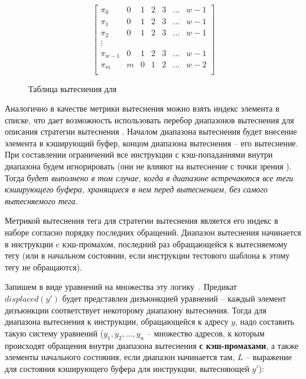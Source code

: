 \begin{figure}
$$
  \left[
    \begin{array}{c|cccccc}
      \pi_0 & 0 & 1 & 2 & 3 & \dots & w-1 \\
      \pi_1 & 0 & 1 & 2 & 3 & \dots & w-1 \\
      \pi_2 & 0 & 1 & 2 & 3 & \dots & w-1 \\
      \vdots &  &  &  & & & \\
      \pi_{w-1} & 0 & 1 & 2 & 3 & \dots & w-1 \\
      \pi_m & m & 0 & 1 & 2 & \dots & w-2 \\
    \end{array}
  \right]
$$
\caption{Таблица вытеснения для \FIFO}\label{fifo_policy_table}
\end{figure}

Аналогично \LRU в качестве метрики вытеснения можно взять индекс
элемента в списке, что дает возможность использовать перебор
диапазонов вытеснения для описания стратегии вытеснения \FIFO.
Началом диапазона вытеснения будет внесение элемента в кэширующий
буфер, концом диапазона вытеснения -- его вытеснение. При
составлении ограничений все инструкции с кэш-попаданиями внутри
диапазона будем игнорировать (они не влияют на вытеснение с точки
зрения \FIFO). Тогда \emph{\FIFO будет выполнено в том случае, когда
в диапазоне встречаются все теги кэширующего буфера, хранящиеся в
нем перед вытеснением, без самого вытесняемого тега}.

\begin{utv}
Метрикой вытеснения тега для стратегии вытеснения \FIFO является его
индекс в наборе согласно порядку последних обращений. Диапазон
вытеснения начинается в инструкции c кэш-промахом, последний раз
обращающейся к вытесняемому тегу (или в начальном состоянии, если
инструкции тестового шаблона к этому тегу не обращаются).
\end{utv}

Запишем в виде уравнений на множества эту логику~\cite{my_nivc_2009}. Предикат\\
$displaced(y')$ будет представлен дизъюнкцией уравнений -- каждый
элемент дизъюнкции соответствует некоторому диапазону вытеснения.
Тогда для диапазона вытеснения к инструкции, обращающейся к адресу
$y$, надо составить такую систему уравнений ($y_1, y_2, ..., y_n$ --
множество адресов, к которым происходят обращения внутри диапазона
вытеснения \textbf{с кэш-промахами}, а также элементы начального
состояния, если диапазон начинается там, $L$ -- выражение для
состояния кэширующего буфера для инструкции, вытесняющей $y'$):
\begin{theorem}\label{FIFO_equation} \DiapazonFIFO
\end{theorem}


